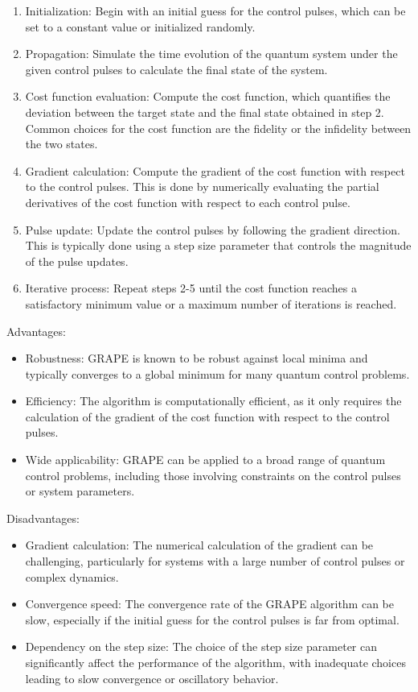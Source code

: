 \begin{enumerate}
    \item Initialization: Begin with an initial guess for the control pulses, which can be set to a constant value or initialized randomly.
    \item Propagation: Simulate the time evolution of the quantum system under the given control pulses to calculate the final state of the system.
    \item Cost function evaluation: Compute the cost function, which quantifies the deviation between the target state and the final state obtained in step 2. Common choices for the cost function are the fidelity or the infidelity between the two states.
    \item Gradient calculation: Compute the gradient of the cost function with respect to the control pulses. This is done by numerically evaluating the partial derivatives of the cost function with respect to each control pulse.
    \item Pulse update: Update the control pulses by following the gradient direction. This is typically done using a step size parameter that controls the magnitude of the pulse updates.
    \item Iterative process: Repeat steps 2-5 until the cost function reaches a satisfactory minimum value or a maximum number of iterations is reached.
\end{enumerate}

Advantages:

\begin{itemize}
    \item Robustness: GRAPE is known to be robust against local minima and typically converges to a global minimum for many quantum control problems.
    \item Efficiency: The algorithm is computationally efficient, as it only requires the calculation of the gradient of the cost function with respect to the control pulses.
    \item Wide applicability: GRAPE can be applied to a broad range of quantum control problems, including those involving constraints on the control pulses or system parameters.
\end{itemize}

Disadvantages:

\begin{itemize}
    \item Gradient calculation: The numerical calculation of the gradient can be challenging, particularly for systems with a large number of control pulses or complex dynamics.
    \item Convergence speed: The convergence rate of the GRAPE algorithm can be slow, especially if the initial guess for the control pulses is far from optimal.
    \item Dependency on the step size: The choice of the step size parameter can significantly affect the performance of the algorithm, with inadequate choices leading to slow convergence or oscillatory behavior.
\end{itemize}


